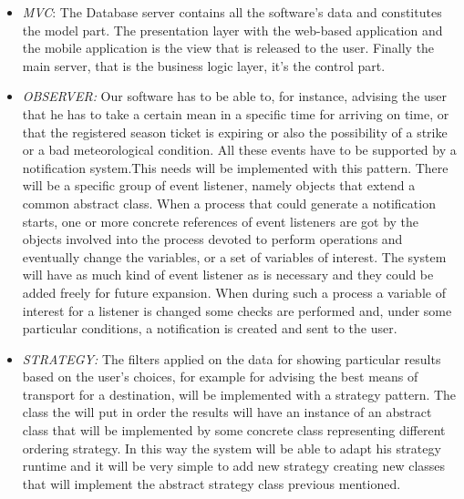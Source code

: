 \begin{itemize}
	\item 
\emph{MVC}: The Database server contains all the software’s data and constitutes the model part. The presentation layer with the web-based application and the mobile application is the view that is released to the user. Finally the main server,  that is the business logic layer, it’s the control part.

\item \emph{OBSERVER:} Our software has to be able to, for instance, advising the user that he has to take a certain mean in a specific time for arriving on time, or that the registered season ticket is expiring or also the possibility of a strike or a bad meteorological condition. All these events have to be supported by a notification system.This needs will be implemented with this pattern.  There will be a specific group of event listener, namely objects that extend a common abstract class. When a process that could generate a notification starts, one or more concrete references of event listeners are got by the objects involved into the process devoted to perform operations and eventually change the variables, or a set of variables of interest. The system will have as much kind of event listener as is necessary and they could be added freely for future expansion. When during such a process a variable of interest for a listener is changed some checks are performed and, under some particular conditions, a notification is created and sent to the user. 

\item \emph{STRATEGY:} The filters applied on the data for showing particular results based on the user’s choices, for example for advising the best means of transport for a destination, will be implemented with a strategy pattern. The class the will put in order the results will have an instance of an abstract class that will be implemented by some concrete class representing different ordering strategy. In this way the system will be able to adapt his strategy runtime and it will be very simple to add new strategy creating new classes that will implement the abstract strategy class previous mentioned.


\end{itemize}
